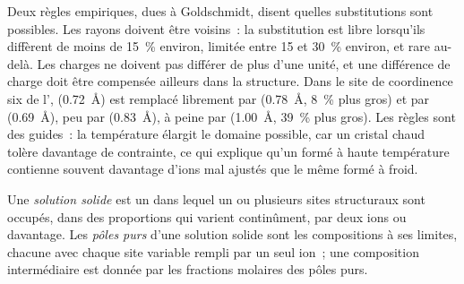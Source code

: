 Deux règles empiriques, dues à Goldschmidt, disent quelles substitutions sont
possibles. Les rayons doivent être voisins~: la substitution est libre lorsqu'ils
diffèrent de moins de \qty{15}{\percent} environ, limitée entre 15 et
\qty{30}{\percent} environ, et rare au-delà. Les charges ne doivent pas différer
de plus d'une unité, et une différence de charge doit être compensée ailleurs
dans la structure. Dans le site de coordinence six de l', 
(\qty{0.72}{\angstrom}) est remplacé librement par 
(\qty{0.78}{\angstrom}, \qty{8}{\percent} plus gros) et par 
(\qty{0.69}{\angstrom}), peu par 
(\qty{0.83}{\angstrom}), à peine par  (\qty{1.00}{\angstrom},
\qty{39}{\percent} plus gros).
Les règles sont des guides~: la température élargit le domaine possible, car un
cristal chaud tolère davantage de contrainte, ce qui explique qu'un  formé
à haute température contienne souvent davantage d'ions mal ajustés que le même
 formé à froid.

\begin{definition}\label{def:b1:rock-forming-minerals:solid-solution}
Une \emph{solution solide} est un  dans lequel un ou plusieurs sites
structuraux sont occupés, dans des proportions qui varient continûment, par deux
ions ou davantage. Les \emph{pôles purs} d'une solution solide sont les
compositions à ses limites, chacune avec chaque site variable rempli par un seul
ion~; une composition intermédiaire est donnée par les fractions molaires des
pôles purs.
\end{definition}

